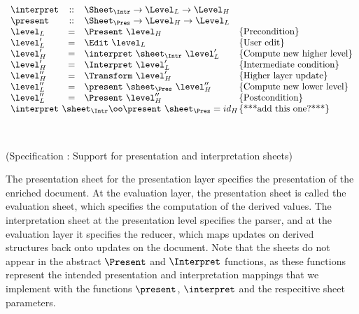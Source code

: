\begin{small}
 \label{spec:sheets}
\( \begin{array}{lcll}
\interpret &::& \Sheet_{\Intr} \rightarrow  \Level_{L} \rightarrow \Level_{H} \\
\present &::& \Sheet_{\Pres} \rightarrow  \Level_{H} \rightarrow \Level_{L} \\
\level_{L} & = & \Present~\level_{H}					& \text{\{Precondition\}}\\
\level'_{L} & = & \Edit~\level_{L}						& \text{\{User edit\}}\\
\level'_{H} & = & \interpret~\sheet_{\Intr}~\level'_{L}	& \text{\{Compute new higher level\}}\\
\level'_{H} & = & \Interpret~\level'_{L}					& \text{\{Intermediate condition\}}\\
\level''_{H}& = & \Transform~\level'_{H} 					& \text{\{Higher layer update\}}\\
\level''_{L} & = & \present~\sheet_{\Pres}~\level''_{H}    & \text{\{Compute new lower level\}}\\
\level''_{L} & = & \Present~\level''_{H}					& \text{\{Postcondition\}}\\
\lefteqn{\interpret~\sheet_{\Intr} \oo \present~\sheet_{\Pres} = id_{H}} & & & \text{\{***add this one?***\}}\\
\end{array}\)\end{small}\\
\begin{center}(Specification \thespecification: Support for presentation and interpretation sheets)\end{center}\vspace{1em}

The presentation sheet for the presentation layer specifies the presentation of the enriched document. At the evaluation layer, the presentation sheet is called the evaluation sheet, which specifies the computation of the derived values. The interpretation sheet at the presentation level specifies the parser, and at the evaluation layer it specifies the reducer, which maps updates on derived structures back onto updates on the document. Note that the sheets do not appear in the abstract $\Present$ and $\Interpret$ functions, as these functions represent the intended presentation and interpretation mappings that we implement with the functions 
$\present$, $\interpret$ and the respecitive sheet parameters.

